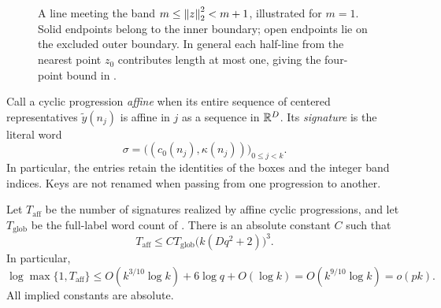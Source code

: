 \begin{figure}[htbp]
 \centering
 
 \caption{A line meeting the band $m\le\left\lVert z\right\rVert_2^2<m+1$, illustrated
 for $m=1$.  Solid endpoints belong to the inner boundary; open endpoints
 lie on the excluded outer boundary.  In general each half-line from
 the nearest point $z_0$ contributes length at most one, giving the
 four-point bound in .}
 \label{perturb:norm-band}
\end{figure}

Call a cyclic progression \emph{affine} when its entire sequence of
centered representatives $\tilde y(n_j)$ is affine in $j$ as a sequence
in $\mathbb R^D$.  Its \emph{signature} is the literal word
\begin{equation}\label{perturb:signature}
 \sigma=\bigl((c_0(n_j),\kappa(n_j))\bigr)_{0\le j<k}.
\end{equation}
In particular, the entries retain the identities of the boxes and the
integer band indices.  Keys are not renamed when passing from one
progression to another.

\begin{lemma}\label{perturb:signatures}
Let $T_{\mathrm{aff}}$ be the number of signatures realized by affine
cyclic progressions, and let $T_{\mathrm{glob}}$ be the full-label word
count of .  There is an absolute constant $C$ such
that
\begin{equation}\label{perturb:signature-count}
 T_{\mathrm{aff}}
 \le C T_{\mathrm{glob}}\bigl(k(Dq^2+2)\bigr)^3.
\end{equation}
In particular,
\begin{equation}\label{perturb:entropy}
 \log\max\{1,T_{\mathrm{aff}}\}
 \le O(k^{3/10}\log k)+6\log q+O(\log k)
 =O(k^{9/10}\log k)=o(pk).
\end{equation}
All implied constants are absolute.
\end{lemma}


